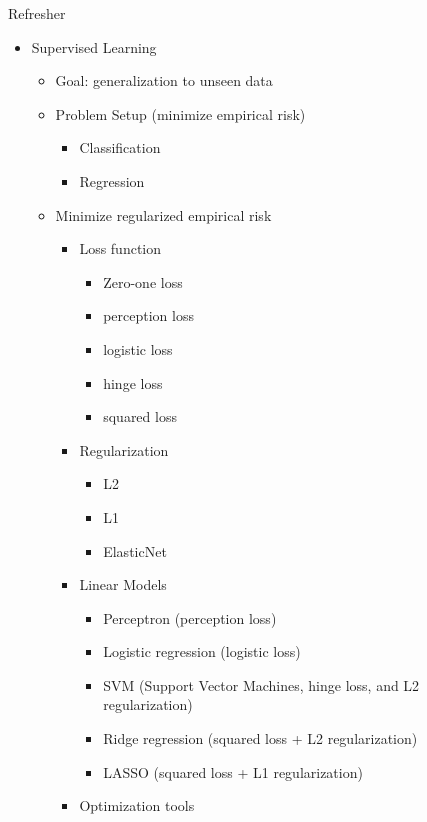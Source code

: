 \documentclass[10pt, oneside]{article}
\begin{document}
Refresher
\begin{itemize}
    \item Supervised Learning
    \begin{itemize}
        \item Goal: generalization to unseen data
        \item Problem Setup (minimize empirical risk)
        \begin{itemize}
            \item Classification
            \item Regression
        \end{itemize}
        \item Minimize regularized empirical risk
        \begin{itemize}
            \item Loss function
            \begin{itemize}
                \item Zero-one loss
                \item perception loss
                \item logistic loss
                \item hinge loss
                \item squared loss
            \end{itemize}
            \item Regularization
            \begin{itemize}
                \item L2
                \item L1
                \item ElasticNet
            \end{itemize}
            \item Linear Models
            \begin{itemize}
                \item Perceptron (perception loss)
                \item Logistic regression (logistic loss)
                \item SVM (Support Vector Machines, hinge loss, and L2 regularization)
                \item Ridge regression (squared loss + L2 regularization)
                \item LASSO (squared loss + L1 regularization)
            \end{itemize}
            \item Optimization tools

\end{itemize}
\end{itemize}
\end{itemize}
\end{document}
